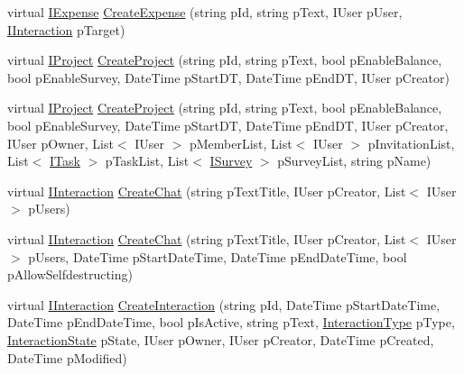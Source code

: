 \begin{DoxyCompactItemize}
\item 
virtual \hyperlink{interface_plex_byte_1_1_mo_cap_1_1_interactions_1_1_i_expense}{I\+Expense} \hyperlink{class_plex_byte_1_1_mo_cap_1_1_interactions_1_1_interaction_factory_a40751419f32c51ae9cfa556b22c8fd7f}{Create\+Expense} (string p\+Id, string p\+Text, I\+User p\+User, \hyperlink{interface_plex_byte_1_1_mo_cap_1_1_interactions_1_1_i_interaction}{I\+Interaction} p\+Target)
\item 
virtual \hyperlink{interface_plex_byte_1_1_mo_cap_1_1_interactions_1_1_i_project}{I\+Project} \hyperlink{class_plex_byte_1_1_mo_cap_1_1_interactions_1_1_interaction_factory_a38a010ef1a5e042ccbb1250adaa2324d}{Create\+Project} (string p\+Id, string p\+Text, bool p\+Enable\+Balance, bool p\+Enable\+Survey, Date\+Time p\+Start\+DT, Date\+Time p\+End\+DT, I\+User p\+Creator)
\item 
virtual \hyperlink{interface_plex_byte_1_1_mo_cap_1_1_interactions_1_1_i_project}{I\+Project} \hyperlink{class_plex_byte_1_1_mo_cap_1_1_interactions_1_1_interaction_factory_ab8dddf10ff7dd5720603c1859d96a78d}{Create\+Project} (string p\+Id, string p\+Text, bool p\+Enable\+Balance, bool p\+Enable\+Survey, Date\+Time p\+Start\+DT, Date\+Time p\+End\+DT, I\+User p\+Creator, I\+User p\+Owner, List$<$ I\+User $>$ p\+Member\+List, List$<$ I\+User $>$ p\+Invitation\+List, List$<$ \hyperlink{interface_plex_byte_1_1_mo_cap_1_1_interactions_1_1_i_task}{I\+Task} $>$ p\+Task\+List, List$<$ \hyperlink{interface_plex_byte_1_1_mo_cap_1_1_interactions_1_1_i_survey}{I\+Survey} $>$ p\+Survey\+List, string p\+Name)
\item 
virtual \hyperlink{interface_plex_byte_1_1_mo_cap_1_1_interactions_1_1_i_interaction}{I\+Interaction} \hyperlink{class_plex_byte_1_1_mo_cap_1_1_interactions_1_1_interaction_factory_a8499cf461c2028c8e47f61056856a47d}{Create\+Chat} (string p\+Text\+Title, I\+User p\+Creator, List$<$ I\+User $>$ p\+Users)
\item 
virtual \hyperlink{interface_plex_byte_1_1_mo_cap_1_1_interactions_1_1_i_interaction}{I\+Interaction} \hyperlink{class_plex_byte_1_1_mo_cap_1_1_interactions_1_1_interaction_factory_a90e50fa9b778353e619c059ea5b78822}{Create\+Chat} (string p\+Text\+Title, I\+User p\+Creator, List$<$ I\+User $>$ p\+Users, Date\+Time p\+Start\+Date\+Time, Date\+Time p\+End\+Date\+Time, bool p\+Allow\+Selfdestructing)
\item 
virtual \hyperlink{interface_plex_byte_1_1_mo_cap_1_1_interactions_1_1_i_interaction}{I\+Interaction} \hyperlink{class_plex_byte_1_1_mo_cap_1_1_interactions_1_1_interaction_factory_a43297682c502977cf7ebc69a9fe8b15f}{Create\+Interaction} (string p\+Id, Date\+Time p\+Start\+Date\+Time, Date\+Time p\+End\+Date\+Time, bool p\+Is\+Active, string p\+Text, \hyperlink{namespace_plex_byte_1_1_mo_cap_1_1_interactions_a6e7bea333446664bbce2bb296db25e31}{Interaction\+Type} p\+Type, \hyperlink{namespace_plex_byte_1_1_mo_cap_1_1_interactions_afcb673d9186608b6bd3b187179aedc8a}{Interaction\+State} p\+State, I\+User p\+Owner, I\+User p\+Creator, Date\+Time p\+Created, Date\+Time p\+Modified)
\end{DoxyCompactItemize}


